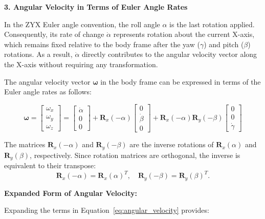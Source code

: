 \documentclass[12pt]{article}
\begin{document}
\vspace{0.5cm}

\textbf{3. Angular Velocity in Terms of Euler Angle Rates}

In the ZYX Euler angle convention, the roll angle $\alpha$ is the last rotation applied. Consequently, its rate of change $\dot{\alpha}$ represents rotation about the current X-axis, which remains fixed relative to the body frame after the yaw ($\gamma$) and pitch ($\beta$) rotations. As a result, $\dot{\alpha}$ directly contributes to the angular velocity vector along the X-axis without requiring any transformation.

The angular velocity vector $\boldsymbol{\omega}$ in the body frame can be expressed in terms of the Euler angle rates as follows:

\begin{equation}
    \label{eq:angular_velocity}
    \boldsymbol{\omega}=
    \begin{bmatrix}
        \omega_x \\
        \omega_y \\
        \omega_z
    \end{bmatrix}
    =
    \begin{bmatrix}
        \dot{\alpha} \\
        0 \\
        0
    \end{bmatrix}
    +
    \mathbf{R}_x(-\alpha)
    \begin{bmatrix}
        0 \\
        \dot{\beta} \\
        0
    \end{bmatrix}
    +
    \mathbf{R}_x(-\alpha) \mathbf{R}_y(-\beta)
    \begin{bmatrix}
        0 \\
        0 \\
        \dot{\gamma}
    \end{bmatrix}
\end{equation}

The matrices $\mathbf{R}_x(-\alpha)$ and $\mathbf{R}_y(-\beta)$ are the inverse rotations of $\mathbf{R}_x(\alpha)$ and $\mathbf{R}_y(\beta)$, respectively. Since rotation matrices are orthogonal, the inverse is equivalent to their transpose:
\[
\mathbf{R}_x(-\alpha) = \mathbf{R}_x(\alpha)^T, \quad \mathbf{R}_y(-\beta) = \mathbf{R}_y(\beta)^T.
\]

\textbf{Expanded Form of Angular Velocity:}

Expanding the terms in Equation~\ref{eq:angular_velocity} provides:
\end{document}
